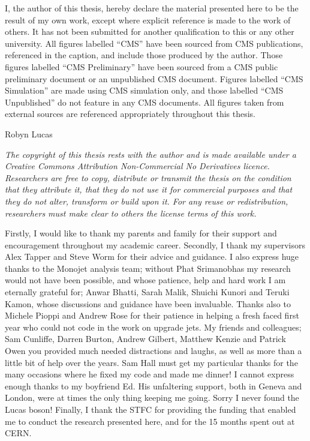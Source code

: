 \begin{declaration}
  I, the author of this thesis, hereby declare the material presented here 
  to be the result of my own work, except where explicit
  reference is made to the work of others.
  It has not been submitted for another qualification to this or any other university. 
  All figures labelled ``CMS'' have been sourced from CMS publications, referenced in the caption, and include those produced by the author.
  Those figures labelled ``CMS Preliminary'' have been sourced from a CMS public preliminary document or an unpublished CMS document.
  Figures labelled ``CMS Simulation'' are made using CMS simulation only, and those labelled ``CMS Unpublished'' do not feature in any CMS documents.
  All figures taken from external sources are referenced appropriately throughout this thesis.
  \vspace*{1cm}
  \begin{flushright}
   Robyn Lucas 
  \end{flushright}
{\it The copyright of this thesis rests with the author and is made available under a Creative Commons Attribution Non-Commercial No Derivatives licence. Researchers are free to copy, distribute or transmit the thesis on the condition that they attribute it, that they do not use it for commercial purposes and that they do not alter, transform or build upon it. For any reuse or redistribution, researchers must make clear to others the license terms of this work.}
\end{declaration}


\begin{acknowledgements}
  Firstly, I would like to thank my parents and family for their support and encouragement throughout my academic career.
  Secondly, I thank my supervisors Alex Tapper and Steve Worm for their advice and guidance.
  I also express huge thanks to the Monojet analysis team; without Phat Srimanobhas my research would not have been possible, and whose patience, help and hard work I am eternally grateful for; Anwar Bhatti, Sarah Malik, Shuichi Kunori and Teruki Kamon, whose discussions and guidance have been invaluable.
  Thanks also to Michele Pioppi and Andrew Rose for their patience in helping a fresh faced first year who could not code in the work on upgrade jets.
  My friends and colleagues; Sam Cunliffe, Darren Burton, Andrew Gilbert, Matthew Kenzie and Patrick Owen you provided much needed distractions and laughs, as well as more than a little bit of help over the years. 
  Sam Hall must get my particular thanks for the many occasions where he fixed my code and made me dinner!
  I cannot express enough thanks to my boyfriend Ed. 
  His unfaltering support, both in Geneva and London, were at times the only thing keeping me going. Sorry I never found the Lucas boson!
  Finally, I thank the STFC for providing the funding that enabled me to conduct the research presented here, and for the 15 months spent out at CERN.
\end{acknowledgements}


